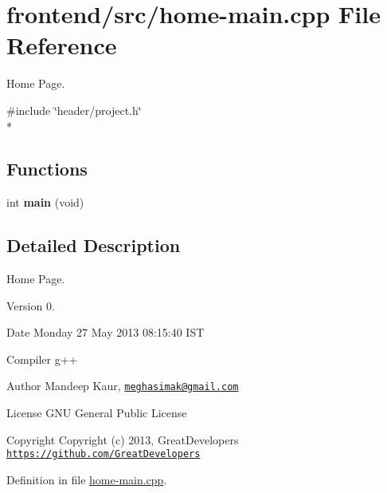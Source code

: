 \hypertarget{home-main_8cpp}{\section{frontend/src/home-\/main.cpp File Reference}
\label{home-main_8cpp}
}


Home Page.  


{\ttfamily \#include \char`\"{}header/project.\-h\char`\"{}}\\*
\subsection*{Functions}
\begin{DoxyCompactItemize}
\item 
\hypertarget{home-main_8cpp_a840291bc02cba5474a4cb46a9b9566fe}{int {\bfseries main} (void)}\label{home-main_8cpp_a840291bc02cba5474a4cb46a9b9566fe}

\end{DoxyCompactItemize}


\subsection{Detailed Description}
Home Page. \begin{DoxyVersion}{Version}
0. 
\end{DoxyVersion}
\begin{DoxyDate}{Date}
Monday 27 May 2013 08\-:15\-:40 I\-S\-T\par
 Compiler g++
\end{DoxyDate}
\begin{DoxyAuthor}{Author}
Mandeep Kaur, \href{mailto:meghasimak@gmail.com}{\tt meghasimak@gmail.\-com}\par
 License G\-N\-U General Public License 
\end{DoxyAuthor}
\begin{DoxyCopyright}{Copyright}
Copyright (c) 2013, Great\-Developers \href{https://github.com/GreatDevelopers}{\tt https\-://github.\-com/\-Great\-Developers} 
\end{DoxyCopyright}


Definition in file \hyperlink{home-main_8cpp_source}{home-\/main.\-cpp}.

